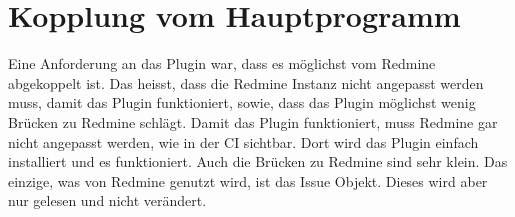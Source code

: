 \section{Kopplung vom Hauptprogramm}
Eine Anforderung an das Plugin war, dass es möglichst vom Redmine abgekoppelt ist. Das heisst, dass die
Redmine Instanz nicht angepasst werden muss, damit das Plugin funktioniert, sowie, dass das Plugin möglichst
wenig Brücken zu Redmine schlägt. \newline
Damit das Plugin funktioniert, muss Redmine gar nicht angepasst werden, wie in der CI sichtbar. Dort wird
das Plugin einfach installiert und es funktioniert. Auch die Brücken zu Redmine sind sehr klein. Das einzige,
was von Redmine genutzt wird, ist das Issue Objekt. Dieses wird aber nur gelesen und nicht verändert.
